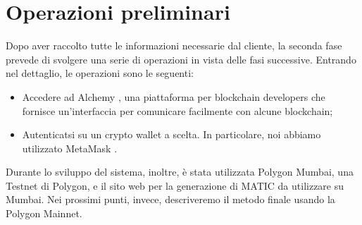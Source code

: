 \documentclass[12pt]{report}
\begin{document}
\section{Operazioni preliminari}
Dopo aver raccolto tutte le informazioni necessarie dal cliente, la seconda fase prevede di svolgere una serie di operazioni in vista delle fasi successive.\newline
Entrando nel dettaglio, le operazioni sono le seguenti:
\begin{itemize}[topsep=5pt, itemsep=0pt]
    \item Accedere ad Alchemy \cite{Diciassette}, una piattaforma per blockchain developers che fornisce un’interfaccia per comunicare facilmente con alcune blockchain;
    \item Autenticatsi su un crypto wallet a scelta. In particolare, noi abbiamo utilizzato MetaMask \cite{Diciotto}.
\end{itemize}
Durante lo sviluppo del sistema, inoltre, è stata utilizzata Polygon Mumbai, una Testnet di Polygon, e il sito web \cite{Diciannove} per la generazione di MATIC da utilizzare su Mumbai.\newline
Nei prossimi punti, invece, descriveremo il metodo finale usando la Polygon Mainnet.\newpage
\end{document}
